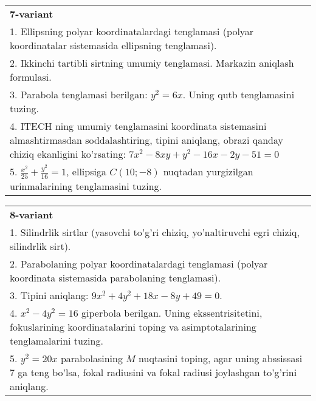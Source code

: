 \documentclass{article}
\begin{document}
\begin{tabular}{m{17cm}}
\textbf{7-variant}\\
1. Ellipsning polyar koordinatalardagi tenglamasi (polyar koordinatalar sistemasida ellipsning tenglamasi).\\

2. Ikkinchi tartibli sirtning umumiy tenglamasi. Markazin aniqlash formulasi.\\

3. Parabola tenglamasi berilgan: $y^2=6x$. Uning qutb tenglamasini tuzing.\\

4. ITECH ning umumiy tenglamasini koordinata sistemasini almashtirmasdan soddalashtiring, tipini aniqlang, obrazi qanday chiziq ekanligini ko'rsating: $7x^{2} - 8xy + y^{2} - 16x - 2y - 51 = 0$\\

5. $\frac{x^{2}}{25} + \frac{y^{2}}{16} = 1$, ellipsiga $C(10; - 8)$ nuqtadan yurgizilgan urinmalarining tenglamasini tuzing.  
\end{tabular}
\vspace{1cm}


\begin{tabular}{m{17cm}}
\textbf{8-variant}\\
1. Silindrlik sirtlar (yasovchi to'g'ri chiziq, yo'naltiruvchi egri chiziq, silindrlik sirt).\\

2. Parabolaning polyar koordinatalardagi tenglamasi (polyar koordinata sistemasida parabolaning tenglamasi).\\

3. Tipini aniqlang: $9x^{2}+4y^{2}+18x-8y+49=0$.\\

4. $x^{2} - 4y^{2} = 16$ giperbola berilgan. Uning ekssentrisitetini, fokuslarining koordinatalarini toping va asimptotalarining tenglamalarini tuzing.\\

5. $y^{2} = 20x$ parabolasining $M$ nuqtasini toping, agar uning abssissasi 7 ga teng bo'lsa, fokal radiusini va fokal radiusi joylashgan to'g'rini aniqlang.
\end{tabular}
\vspace{1cm}
\end{document}
